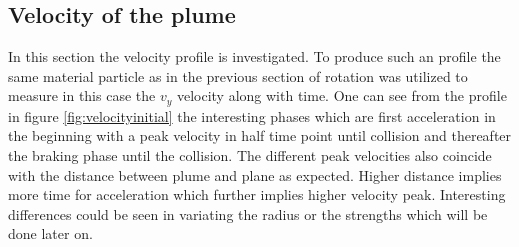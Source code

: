 \documentclass[12pt]{scrreprt}
\begin{document}
\subsection{Velocity of the plume}
In this section the velocity profile is investigated. To produce such an profile the same material particle as in the previous section of rotation was utilized to measure in this case the $v_y$ velocity along with time. One can see from the profile in figure \ref{fig:velocityinitial} the interesting phases which are first acceleration in the beginning with a peak velocity in half time point until collision and thereafter the braking phase until the collision. The different peak velocities also coincide with the distance between plume and plane as expected. Higher distance implies more time for acceleration which further implies higher velocity peak. Interesting differences could be seen in variating the radius or the strengths which will be done later on.
\end{document}
